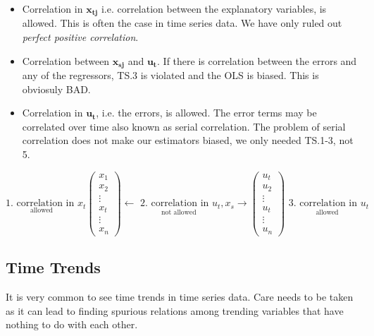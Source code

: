 \documentclass[11pt]{article}
\begin{document}
\begin{shaded}
\begin{itemize}
    \item Correlation in $\boldsymbol{x_{tj}}$ i.e. correlation between the explanatory variables, is allowed. This is often the case in time series data. We have only ruled out \textit{perfect positive correlation}.

    \item Correlation between $\boldsymbol{x_{sj}}$ and $\boldsymbol{u_t}$. If there is correlation between the errors and any of the regressors, TS.3 is violated and the OLS is biased. This is obviosuly BAD.

    \item Correlation in $\boldsymbol{u_t}$, i.e. the errors, is allowed. The error terms may be correlated over time also known as serial correlation. The problem of serial correlation does not make our estimators biased, we only needed TS.1-3, not 5.
\end{itemize}

\begin{equation}
\underset{\text{allowed}}{\text{1. correlation in }}x_t\left(\begin{array}{c}
x_1 \\
x_2 \\
\vdots \\
x_t \\
\vdots \\
x_n
\end{array}\right) \longleftarrow \underset{\text{not allowed}}{\text { 2. correlation in } u_t}, x_s \rightarrow\left(\begin{array}{c}
u_t \\
u_2 \\
\vdots \\
u_t \\
\vdots \\
u_n
\end{array}\right) \underset{\text{allowed}}{\text { 3. correlation in } u_t} 
\end{equation}
\end{shaded}

\subsection{Time Trends}

It is very common to see time trends in time series data. Care needs to be taken as it can lead to finding spurious relations among trending variables that have nothing to do with each other.
\end{document}
